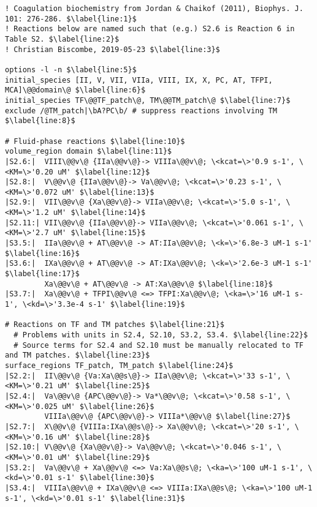 \documentclass[fontsize=12pt,
               captions=abovetable,
               numbers=noenddot,
              ]{scrartcl}
\begin{document}
\begin{lstlisting}[float=p,caption={An example .rxn file (examples\slash{}thrombin\_generation\_JC\_model.rxn)},label={l:example}]
! Coagulation biochemistry from Jordan & Chaikof (2011), Biophys. J. 101: 276-286. $\label{line:1}$
! Reactions below are named such that (e.g.) S2.6 is Reaction 6 in Table S2. $\label{line:2}$
! Christian Biscombe, 2019-05-23 $\label{line:3}$

options -l -n $\label{line:5}$
initial_species [II, V, VII, VIIa, VIII, IX, X, PC, AT, TFPI, MCA]\@@domain\@ $\label{line:6}$
initial_species TF\@@TF_patch\@, TM\@@TM_patch\@ $\label{line:7}$
exclude /@TM_patch|\bA?PC\b/ # suppress reactions involving TM $\label{line:8}$

# Fluid-phase reactions $\label{line:10}$
volume_region domain $\label{line:11}$
|S2.6:|  VIII\@@v\@ {IIa\@@v\@}-> VIIIa\@@v\@; \<kcat=\>'0.9 s-1', \<KM=\>'0.20 uM' $\label{line:12}$
|S2.8:|  V\@@v\@ {IIa\@@v\@}-> Va\@@v\@; \<kcat=\>'0.23 s-1', \<KM=\>'0.072 uM' $\label{line:13}$
|S2.9:|  VII\@@v\@ {Xa\@@v\@}-> VIIa\@@v\@; \<kcat=\>'5.0 s-1', \<KM=\>'1.2 uM' $\label{line:14}$
|S2.11:| VII\@@v\@ {IIa\@@v\@}-> VIIa\@@v\@; \<kcat=\>'0.061 s-1', \<KM=\>'2.7 uM' $\label{line:15}$
|S3.5:|  IIa\@@v\@ + AT\@@v\@ -> AT:IIa\@@v\@; \<k=\>'6.8e-3 uM-1 s-1' $\label{line:16}$
|S3.6:|  IXa\@@v\@ + AT\@@v\@ -> AT:IXa\@@v\@; \<k=\>'2.6e-3 uM-1 s-1' $\label{line:17}$
         Xa\@@v\@ + AT\@@v\@ -> AT:Xa\@@v\@ $\label{line:18}$
|S3.7:|  Xa\@@v\@ + TFPI\@@v\@ <=> TFPI:Xa\@@v\@; \<ka=\>'16 uM-1 s-1', \<kd=\>'3.3e-4 s-1' $\label{line:19}$

# Reactions on TF and TM patches $\label{line:21}$
  # Problems with units in S2.4, S2.10, S3.2, S3.4. $\label{line:22}$
  # Source terms for S2.4 and S2.10 must be manually relocated to TF and TM patches. $\label{line:23}$
surface_regions TF_patch, TM_patch $\label{line:24}$
|S2.2:|  II\@@v\@ {Va:Xa\@@s\@}-> IIa\@@v\@; \<kcat=\>'33 s-1', \<KM=\>'0.21 uM' $\label{line:25}$
|S2.4:|  Va\@@v\@ {APC\@@v\@}-> Va*\@@v\@; \<kcat=\>'0.58 s-1', \<KM=\>'0.025 uM' $\label{line:26}$
         VIIIa\@@v\@ {APC\@@v\@}-> VIIIa*\@@v\@ $\label{line:27}$
|S2.7:|  X\@@v\@ {VIIIa:IXa\@@s\@}-> Xa\@@v\@; \<kcat=\>'20 s-1', \<KM=\>'0.16 uM' $\label{line:28}$
|S2.10:| V\@@v\@ {Xa\@@v\@}-> Va\@@v\@; \<kcat=\>'0.046 s-1', \<KM=\>'0.01 uM' $\label{line:29}$
|S3.2:|  Va\@@v\@ + Xa\@@v\@ <=> Va:Xa\@@s\@; \<ka=\>'100 uM-1 s-1', \<kd=\>'0.01 s-1' $\label{line:30}$
|S3.4:|  VIIIa\@@v\@ + IXa\@@v\@ <=> VIIIa:IXa\@@s\@; \<ka=\>'100 uM-1 s-1', \<kd=\>'0.01 s-1' $\label{line:31}$


\end{lstlisting}
\end{document}
